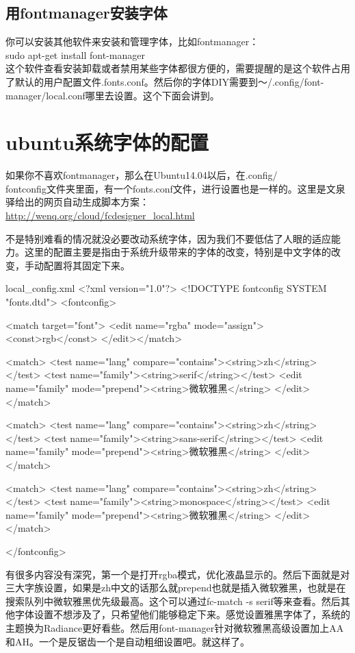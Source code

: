 \documentclass[12pt,oneside]{book}
\begin{document}
\begin{common-format}
\subsection{用fontmanager安装字体}
你可以安装其他软件来安装和管理字体，比如fontmanager：\\
sudo  apt-get install font-manager  \\
这个软件查看安装卸载或者禁用某些字体都很方便的，需要提醒的是这个软件占用了默认的用户配置文件.fonts.conf。然后你的字体DIY需要到～/.config/font-manager/local.conf哪里去设置。这个下面会讲到。



\section{ubuntu系统字体的配置}
如果你不喜欢fontmanager，那么在Ubuntu14.04以后，在.config/\\fontconfig文件夹里面，有一个fonts.conf文件，进行设置也是一样的。这里是文泉驿给出的网页自动生成脚本方案：\\ \href{http://wenq.org/cloud/fcdesigner_local.html}{http://wenq.org/cloud/fcdesigner\_local.html}

不是特别难看的情况就没必要改动系统字体，因为我们不要低估了人眼的适应能力。这里的配置主要是指由于系统升级带来的字体的改变，特别是中文字体的改变，手动配置将其固定下来。
\begin{xverbatim}{local_config.xml}
<?xml version="1.0"?>
<!DOCTYPE fontconfig SYSTEM "fonts.dtd">
<fontconfig>

<match target="font">
	<edit name="rgba" mode="assign"><const>rgb</const>
	</edit></match>

<match>
	<test name="lang" compare="contains"><string>zh</string></test>
	<test name="family"><string>serif</string></test>
	<edit name="family" mode="prepend"><string>微软雅黑</string>
	</edit></match>

<match>
	<test name="lang" compare="contains"><string>zh</string></test>
	<test name="family"><string>sans-serif</string></test>
	<edit name="family" mode="prepend"><string>微软雅黑</string>
	</edit></match>

<match>
	<test name="lang" compare="contains"><string>zh</string></test>
	<test name="family"><string>monospace</string></test>
	<edit name="family" mode="prepend"><string>微软雅黑</string>
	</edit></match>	

</fontconfig>
\end{xverbatim}
有很多内容没有深究，第一个是打开rgba模式，优化液晶显示的。然后下面就是对三大字族设置，如果是zh中文的话那么就prepend也就是插入微软雅黑，也就是在搜索队列中微软雅黑优先级最高。这个可以通过fc-match  -s  serif等来查看。然后其他字体设置不想涉及了，只希望他们能够稳定下来。感觉设置雅黑字体了，系统的主题换为Radiance更好看些。然后用font-manager针对微软雅黑高级设置加上AA和AH。一个是反锯齿一个是自动粗细设置吧。就这样了。


\end{common-format}
\end{document}
